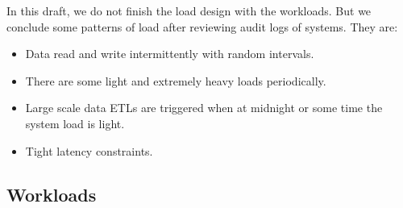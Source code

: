 In this draft, we do not finish the load design with the workloads. But we
conclude some patterns of load after reviewing audit logs of systems. They are:
\begin{itemize}
    \item Data read and write intermittently with random intervals.
    \item There are some light and extremely heavy loads periodically.
    \item Large scale data ETLs are triggered when at midnight or some time the
    system load is light.
    \item Tight latency constraints.
\end{itemize}

\subsection{Workloads}

